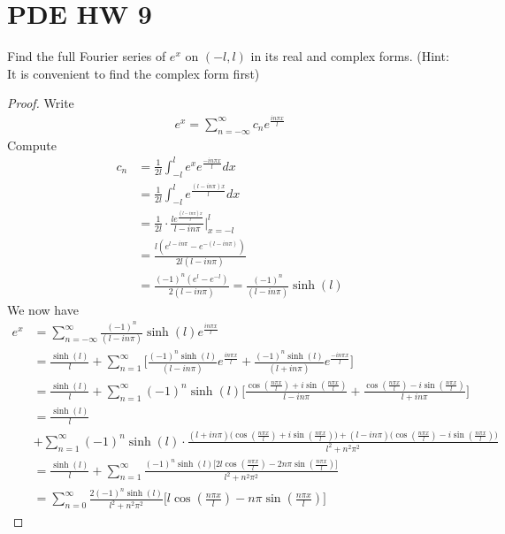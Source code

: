 \documentclass{report}
\begin{document}
\section{PDE HW 9}
\begin{question}{}{}
Find the full Fourier series of $e^x$ on  $(-l,l)$ in its real and complex forms. (Hint: It is convenient to find the complex form first)
\end{question}
\begin{proof}
Write 
\begin{align*}
e^x= \sum_{n=- \infty}^{\infty} c_n e^{ \frac{i n \pi x }{l}}
\end{align*}
Compute 
\begin{align*}
c_n&= \frac{1}{2l}\int_{-l}^{l}e^x e^{\frac{- i n \pi  x}{l}}dx \\
&=\frac{1}{2l}\int_{-l}^{l}e^{ \frac{(l-i n\pi )x}{l}}dx\\
&=\frac{1}{2l} \cdot \frac{le^{\frac{(l-i n \pi )x}{l}}}{l-i n \pi  }\Big|_{x=-l}^{l} \\
&= \frac{l(e^{l- i n \pi }- e^{-(l- i n \pi )})}{2l (l- i n \pi )}\\
&= \frac{(-1)^n (e^l - e^{-l})}{2(l - i n \pi )}= \frac{(-1)^n}{(l- i n \pi )}\sinh (l)
\end{align*}
We now have 
\begin{align*}
e^x&= \sum_{n=-\infty}^{\infty} \frac{(-1)^n}{(l- i n \pi )}\sinh (l) e^{\frac{i n \pi x}{l}} \\
&= \frac{\sinh (l)}{l}+ \sum_{n=1}^{\infty} \Big[\frac{(-1)^n \sinh (l) }{(l- i n \pi )}e^{\frac{i n \pi  x}{l}}+ \frac{(-1)^n \sinh (l)}{(l+ i n \pi )}e^{\frac{- i n \pi x}{l}}  \Big] \\
&=\frac{\sinh (l)}{l}+ \sum_{n=1}^{\infty} (-1)^n\sinh (l) \Big[ \frac{\cos (\frac{n \pi  x}{l})+ i \sin (\frac{n \pi  x}{l})}{l- i n \pi }+ \frac{\cos (\frac{n \pi  x}{l})- i \sin (\frac{n \pi  x}{l})}{l+ i n \pi } \Big]\\
&= \frac{\sinh (l)}{l}\\
&+ \sum_{n=1}^{\infty} (-1)^n \sinh (l) \cdot \frac{(l+ i n \pi )\big(\cos (\frac{n \pi  x}{l})+i \sin (\frac{n \pi  x}{l})  \big)+(l- i n \pi )\big( \cos (\frac{n \pi  x}{l})- i \sin (\frac{n \pi  x}{l}) \big)}{l^2 + n^2 \pi ^2} \\
&=\frac{\sinh (l)}{l}+ \sum_{n=1}^{\infty} \frac{(-1)^n \sinh (l)\big[ 2l \cos (\frac{n \pi  x}{l})-2n \pi  \sin (\frac{n \pi  x}{l}) \big]}{l^2+n^2\pi  ^2} \\
&= \sum_{n=0}^{\infty} \frac{2(-1)^n \sinh (l)}{l^2 + n^2 \pi ^2}\Big[l\cos (\frac{n \pi  x}{l})- n \pi  \sin (\frac{n \pi  x}{l}) \Big]
\end{align*}

\end{proof}
\end{document}
